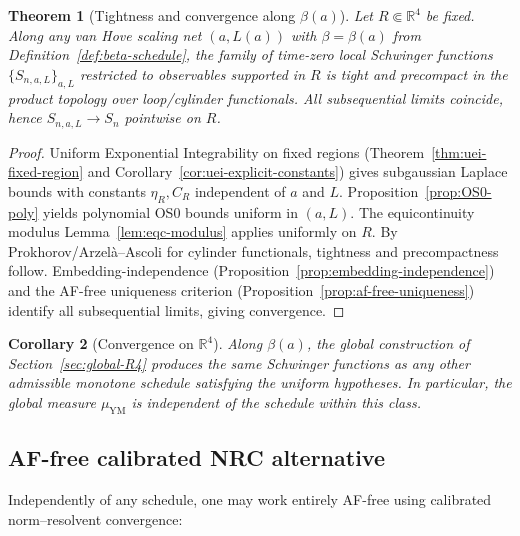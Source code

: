 \documentclass[11pt]{amsart}
\theoremstyle{plain}
\newtheorem{theorem}{Theorem}[section]
\newtheorem{corollary}[theorem]{Corollary}
\theoremstyle{definition}
\theoremstyle{remark}
\begin{document}
\begin{theorem}[Tightness and convergence along $\beta(a)$]\label{thm:tightness-beta}
Let $R\Subset\mathbb R^4$ be fixed. Along any van Hove scaling net $(a,L(a))$ with $\beta=\beta(a)$ from Definition~\ref{def:beta-schedule}, the family of time-zero local Schwinger functions $\{S_{n,a,L}\}_{a,L}$ restricted to observables supported in $R$ is tight and precompact in the product topology over loop/cylinder functionals. All subsequential limits coincide, hence $S_{n,a,L}\to S_n$ pointwise on $R$.
\end{theorem}
\begin{proof}
Uniform Exponential Integrability on fixed regions (Theorem~\ref{thm:uei-fixed-region} and Corollary~\ref{cor:uei-explicit-constants}) gives subgaussian Laplace bounds with constants $\eta_R,C_R$ independent of $a$ and $L$. Proposition~\ref{prop:OS0-poly} yields polynomial OS0 bounds uniform in $(a,L)$. The equicontinuity modulus Lemma~\ref{lem:eqc-modulus} applies uniformly on $R$. By Prokhorov/Arzel\`a--Ascoli for cylinder functionals, tightness and precompactness follow. Embedding-independence (Proposition~\ref{prop:embedding-independence}) and the AF-free uniqueness criterion (Proposition~\ref{prop:af-free-uniqueness}) identify all subsequential limits, giving convergence.
\end{proof}

\begin{corollary}[Convergence on $\mathbb R^4$]\label{cor:global-convergence}
Along $\beta(a)$, the global construction of Section~\ref{sec:global-R4} produces the same Schwinger functions as any other admissible monotone schedule satisfying the uniform hypotheses. In particular, the global measure $\mu_{\mathrm{YM}}$ is independent of the schedule within this class.
\end{corollary}

\subsection{AF-free calibrated NRC alternative}\label{subsec:af-free-alternative}

Independently of any schedule, one may work entirely AF-free using calibrated norm--resolvent convergence:
\end{document}
